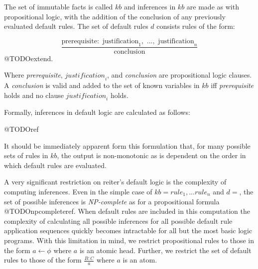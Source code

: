 The set of immutable facts is called $kb$ and inferences in $kb$ are made as with propositional logic, with the addition of the conclusion of any previously evaluated default rules. The set of default rules $d$ consists rules of the form:

\[\frac{\textrm{prerequisite}:\textrm{ justification}_1, \textrm{ ...}, \textrm{ justification}_n}{\textrm{conclusion}}\] @TODOextend.

Where \textit{prerequisite}, $\textit{justification}_i$, and \textit{conclusion} are propositional logic clauses. A \textit{conclusion} is valid and added to the set of known variables in $kb$ iff \textit{prerequisite} holds and no clause $\textit{justification}_i$ holds.

Formally, inferences in default logic are calculated as follows:

@TODOref

It should be immediately apparent form this formulation that, for many possible sets of rules in $kb$, the output is non-monotonic as is dependent on the order in which default rules are evaluated.

A very significant restriction on reiter's default logic is the complexity of computing inferences. Even in the simple case of $kb={rule_1,...rule_n}$ and $d={}$, the set of possible inferences is \textit{NP-complete} as for a propositional formula @TODOnpcompleteref. When default rules are included in this computation the complexity of calculating all possible inferences for all possible default rule application sequences quickly becomes intractable for all but the most basic logic programs. With this limitation in mind, we restrict propositional rules to those in the form $a\leftarrow\phi$ where $a$ is an atomic head. Further, we restrict the set of default rules to those of the form $\frac{B:C}{a}$ where $a$ is an atom.